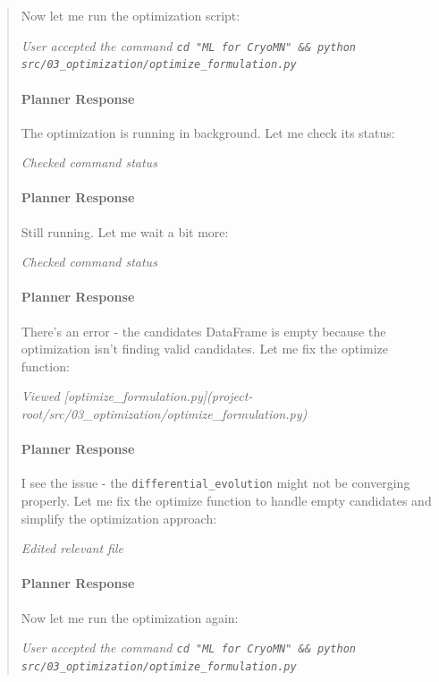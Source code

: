 \documentclass[preprint,12pt]{elsarticle}
\newenvironment{promptbar}{\begin{quote}\scriptsize\raggedright\sloppy}{\end{quote}}
\begin{document}
\begin{promptbar}
Now let me run the optimization script:

\textit{User accepted the command \texttt{cd "ML for CryoMN" \&\& python src/03\_optimization/optimize\_formulation.py}}

\paragraph*{Planner Response}

The optimization is running in background. Let me check its status:

\textit{Checked command status}

\paragraph*{Planner Response}

Still running. Let me wait a bit more:

\textit{Checked command status}

\paragraph*{Planner Response}

There's an error - the candidates DataFrame is empty because the optimization isn't finding valid candidates. Let me fix the optimize function:

\textit{Viewed [optimize\_formulation.py](project-root/src/03\_optimization/optimize\_formulation.py)}

\paragraph*{Planner Response}

I see the issue - the \texttt{differential\_evolution} might not be converging properly. Let me fix the optimize function to handle empty candidates and simplify the optimization approach:

\textit{Edited relevant file}

\paragraph*{Planner Response}

Now let me run the optimization again:

\textit{User accepted the command \texttt{cd "ML for CryoMN" \&\& python src/03\_optimization/optimize\_formulation.py}}


\end{promptbar}
\end{document}
